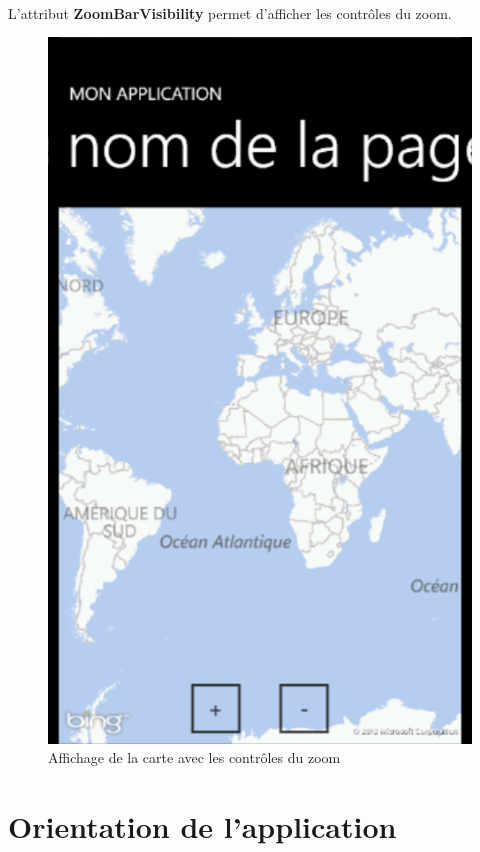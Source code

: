 \documentclass[twoside,UTF8]{EPURapport}
\begin{document}
\paragraph{}
L'attribut \textbf{ZoomBarVisibility} permet d'afficher les contrôles du zoom.

\begin{figure}[H]
	\center
	\includegraphics[scale=0.4]{images/bing.png}
	\caption{Affichage de la carte avec les contrôles du zoom}
\end{figure}

	\section{Orientation de l'application}
\end{document}
